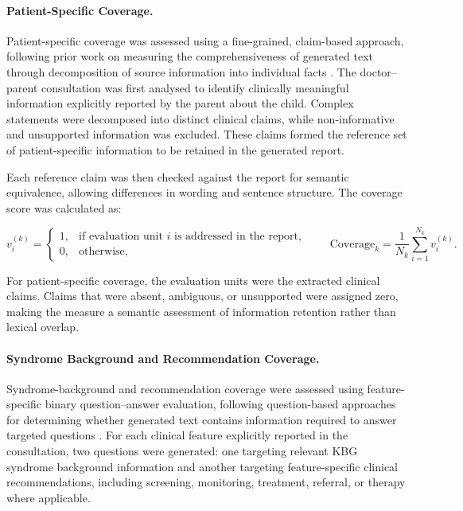 \documentclass[ %
                    author={Aman Kumar Singh},
                supervisor={Dr. Edwin Simpson},
                    degree={MSc},
                     title={Quality-Aware Knowledge Distillation of Large Language Models for Efficient Personalised Clinical Report Generation},
                  subtitle={},
                      type={},
                      year={2021}]{dissertation}
\begin{document}
\paragraph{Patient-Specific Coverage.}

Patient-specific coverage was assessed using a fine-grained, claim-based
approach, following prior work on measuring the comprehensiveness of
generated text through decomposition of source information into individual
facts \cite{dejl_comprehensiveness_2026}. The doctor--parent consultation
was first analysed to identify clinically meaningful information explicitly
reported by the parent about the child. Complex statements were decomposed
into distinct clinical claims, while non-informative and unsupported
information was excluded. These claims formed the reference set of
patient-specific information to be retained in the generated report.

Each reference claim was then checked against the report for semantic
equivalence, allowing differences in wording and sentence structure. The
coverage score was calculated as:

\begin{equation}
v_i^{(k)} =
\begin{cases}
1, & \text{if evaluation unit } i \text{ is addressed in the report},\\
0, & \text{otherwise},
\end{cases}
\qquad
\mathrm{Coverage}_{k}
=
\frac{1}{N_k}
\sum_{i=1}^{N_k}v_i^{(k)}.
\label{eq:component_coverage}
\end{equation}

For patient-specific coverage, the evaluation units were the extracted
clinical claims. Claims that were absent, ambiguous, or unsupported were
assigned zero, making the measure a semantic assessment of information
retention rather than lexical overlap.

\paragraph{Syndrome Background and Recommendation Coverage.}

Syndrome-background and recommendation coverage were assessed using
feature-specific binary question--answer evaluation, following question-based
approaches for determining whether generated text contains information
required to answer targeted questions \cite{scialom_questeval_2021,
moramarco_towards_2021}. For each clinical feature explicitly reported in
the consultation, two questions were generated: one targeting relevant KBG
syndrome background information and another targeting feature-specific
clinical recommendations, including screening, monitoring, treatment,
referral, or therapy where applicable.
\end{document}
